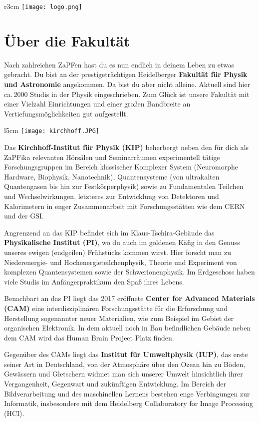 
\begin{wrapfigure}{r}{3cm}
\texttt{[image: logo.png]}
\end{wrapfigure}

\section{Über die Fakultät}

Nach zahlreichen ZaPFen hast du es nun endlich in deinem Leben zu etwas gebracht. Du bist an der prestigeträchtigen Heidelberger \textbf{Fakultät für Physik und Astronomie} angekommen. Da bist du aber nicht alleine. Aktuell sind hier ca.\,2000 Studis in der Physik eingeschrieben. Zum Glück ist unsere Fakultät mit einer Vielzahl Einrichtungen und einer großen Bandbreite an Vertiefungsmöglichkeiten gut aufgestellt.

\begin{wrapfigure}{l}{5cm}
\texttt{[image: kirchhoff.JPG]}
\end{wrapfigure}

Das \textbf{Kirchhoff-Institut für Physik (KIP)} beherbergt neben den für dich als ZaPFika relevanten Hörsälen und Seminarräumen experimentell tätige Forschungsgruppen im Bereich klassischer Komplexer System (Neuromorphe Hardware, Biophysik, Nanotechnik), Quantensysteme (von ultrakalten Quantengasen bis hin zur Festkörperphysik) sowie zu Fundamentalen Teilchen und Wechselwirkungen, letzteres zur Entwicklung von Detektoren und Kalorimetern in enger Zusammenarbeit mit Forschungsstätten wie dem CERN und der GSI.

Angrenzend an das KIP befindet sich im Klaus-Tschira-Gebäude das \textbf{Physikalische Institut (PI)}, wo du auch im goldenen Käfig in den Genuss unseres ewigen (endgeilen) Frühstücks kommen wirst. Hier forscht man zu Niederenergie- und Hochenergieteilchenphysik, Theorie und Experiment von komplexen Quantensystemen sowie der Schwerionenphysik. Im Erdgeschoss haben viele Studis im Anfängerpraktikum den Spaß ihres Lebens.

Benachbart an das PI liegt das 2017 eröffnete \textbf{Center for Advanced Materials (CAM)} eine interdisziplinären Forschungsstätte für die Erforschung und Herstellung sogenannter neuer Materialien, wie zum Beispiel im Gebiet der organischen Elektronik.
In dem aktuell noch in Bau befindlichen Gebäude neben dem CAM wird das Human Brain Project Platz finden. 

Gegenüber des CAMs liegt das \textbf{Institut für Umweltphysik (IUP)}, das erste seiner Art in Deutschland, von der Atmosphäre über den Ozean hin zu Böden, Gewässern und Gletschern widmet man sich unserer Umwelt hinsichtlich ihrer Vergangenheit, Gegenwart und zukünftigen Entwicklung. Im Bereich der Bildverarbeitung und des maschinellen Lernens bestehen enge Verbingungen zur Informatik, insbesondere mit dem Heidelberg Collaboratory for Image Processing (HCI).

